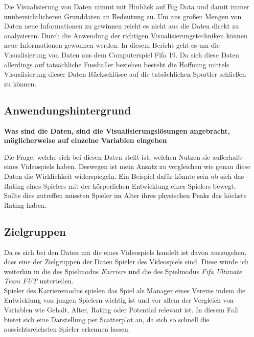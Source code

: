 \documentclass[usegeometry=true]{scrartcl}
\begin{document}
Die Visualisierung von Daten nimmt mit Hinblick auf Big Data und damit immer unübersichtlicheren Grunddaten an Bedeutung zu. Um aus großen Mengen von Daten neue Informationen zu gewinnen reicht es nicht aus die Daten direkt zu analysieren. Durch die Anwendung der richtigen Visualisierungstechniken können neue Informationen gewonnen werden. In diesem Bericht geht es um die Visualisierung von Daten aus dem Computerspiel Fifa 19. Da sich diese Daten allerdings auf tatsächliche Fussballer beziehen besteht die Hoffnung mittels Visualisierung dieser Daten Rückschlüsse auf die tatsächlichen Sportler schließen zu können.


\subsection{Anwendungshintergrund}
\textbf{Was sind die Daten, sind die Visualisierungslösungen angebracht, möglicherweise auf einzelne Variablen eingehen}\cite{Munzner2008}


Die Frage, welche sich bei diesen Daten stellt ist, welchen Nutzen sie außerhalb eines Videospiels haben. Deswegen ist mein Ansatz zu vergleichen wie genau diese Daten die Wirklichkeit widerspiegeln. Ein Beispiel dafür könnte sein ob sich das Rating eines Spielers mit der körperlichen Entwicklung eines Spielers bewegt. Sollte dies zutreffen  müssten Spieler im Alter ihres physischen Peaks das höchste Rating haben. 
\subsection{Zielgruppen}
Da es sich bei den Daten um die eines Videospiels handelt ist davon auszugehen, dass eine der Zielgruppen der Daten Spieler des Videospiels sind. Diese würde ich weiterhin in die des Spielmodus \textit{Karriere} und die des Spielmodus \textit{Fifa Ultimate Team  FUT} unterteilen.\\

Spieler des Karrieremodus spielen das Spiel als Manager eines Vereins indem die Entwicklung von jungen Spielern wichtig ist und vor allem der Vergleich von Variablen wie Gehalt, Alter, Rating oder Potential relevant ist. In diesem Fall bietet sich eine Darstellung per Scatterplot an, da sich so schnell die aussichtsreichsten Spieler erkennen lassen.
\end{document}
